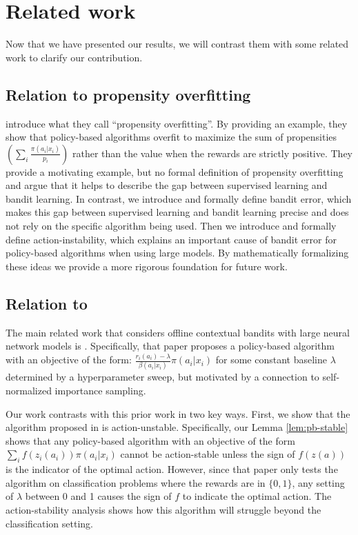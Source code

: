 \section{Related work}\label{sec:related}

Now that we have presented our results, we will contrast them with some related work to clarify our contribution.

\subsection{Relation to propensity overfitting}
\citet{swaminathan2015self} introduce what they call ``propensity overfitting''. By providing an example, they show that policy-based algorithms overfit to maximize the sum of propensities $( \sum_i \frac{\pi(a_i|x_i)}{p_i})$ rather than the value when the rewards are strictly positive. They provide a motivating example, but no formal definition of propensity overfitting and argue that it helps to describe the gap between supervised learning and bandit learning. In contrast, we introduce and formally define bandit error, which makes this gap between supervised learning and bandit learning precise and does not rely on the specific algorithm being used. Then we introduce and formally define action-instability, which explains an important cause of bandit error for policy-based algorithms when using large models.
By mathematically formalizing these ideas we provide a more rigorous foundation for future work.

\subsection{Relation to \cite{joachims2018deep}}

The main related work that considers offline contextual bandits with large neural network models is \citet{joachims2018deep}. Specifically, that paper proposes a policy-based algorithm with an objective of the form: $\frac{r_i(a_i) - \lambda}{\beta(a_i|x_i)} \pi(a_i|x_i)$ for some constant baseline $ \lambda$ determined by a hyperparameter sweep, but motivated by a connection to self-normalized importance sampling.

Our work contrasts with this prior work in two key ways. First, we show that the algorithm proposed in \citet{joachims2018deep} is action-unstable. Specifically, our Lemma \ref{lem:pb-stable} shows that any policy-based algorithm with an objective of the form $ \sum_i f(z_i(a_i)) \pi(a_i|x_i)$ cannot be action-stable unless the sign of $ f(z(a))$ is the indicator of the optimal action. However, since that paper only tests the algorithm on classification problems where the rewards are in $ \{0,1\}$, any setting of $ \lambda$ between 0 and 1 causes the sign of $ f $ to indicate the optimal action. The action-stability analysis shows how this algorithm will struggle beyond the classification setting.

